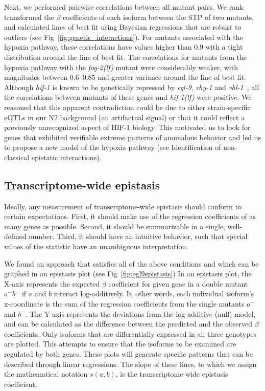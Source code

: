 \documentclass[9pt,twocolumn,twoside]{pnas-new}
\newcommand{\gene}[1]{\mbox{\emph{#1}}}
\newcommand{\fog}{\gene{fog-2(lf)}}
\newcommand{\hif}{\gene{hif-1(lf)}}
\newcommand{\hifp}{HIF-1}
\begin{document}
Next, we performed pairwise correlations between all mutant pairs. We
rank-transformed the $\beta$ coefficients of each isoform between the STP of two
mutants, and calculated lines of best fit using Bayesian regressions that are
robust to outliers (see Fig~\ref{fig:genetic_interactions}). For mutants
associated with the hypoxia pathway, these correlations have values higher than
0.9 with a tight distribution around the line of best fit. The correlations for
mutants from the hypoxia pathway with the \fog{} mutant were considerably
weaker, with magnitudes between 0.6--0.85 and greater variance around the line
of best fit. Although \gene{hif-1} is known to be genetically repressed by
\gene{egl-9}, \gene{rhy-1} and \gene{vhl-1}~\cite{Epstein2001,Shen2006}, all the
correlations between mutants of these genes and \hif{} were positive. We reasoned
that this apparent contradiction could be due to either strain-specific eQTLs in
our N2 background (an artifactual signal) or that it could reflect a previously
unrecognized aspect of \hifp{} biology. This motivated us to look for genes that
exhibited verifiable extreme patterns of anomalous behavior
and led us to propose a new model of the hypoxia pathway (see Identification of
non-classical epistatic interactions).

\subsection*{Transcriptome-wide epistasis}
Ideally, any measurement of transcriptome-wide epistasis should conform to
certain expectations. First, it should make use of the regression coefficients
of as many genes as possible. Second, it should be summarizable in a single,
well-defined number. Third, it should have an intuitive behavior, such that
special values of the statistic have an unambiguous interpretation.

We found an approach that satisfies all of the above conditions and which can
be graphed in an epistasis plot (see Fig~\ref{fig:egl9epistasis})
In an epistasis plot, the X-axis represents the expected $\beta$ coefficient for
given gene in a double
mutant $a^-b^-$ if $a$ and $b$ interact log-additively. In other words, each
individual isoform's x-coordinate is the sum of the regression coefficients from
the single mutants $a^-$ and $b^-$. The Y-axis represents the deviations from
the log-additive (null) model, and can be calculated as the difference between
the predicted and the observed $\beta$ coefficients.
Only isoforms that are differentially expressed in all three genotypes are plotted.
This attempts to ensure that the isoforms to be examined are regulated by both genes.
These plots will generate specific patterns that can be described through linear
regressions. The slope of these lines, to which we assign the mathematical
notation $s({a,b})$, is the transcriptome-wide epistasis coefficient.
\end{document}

